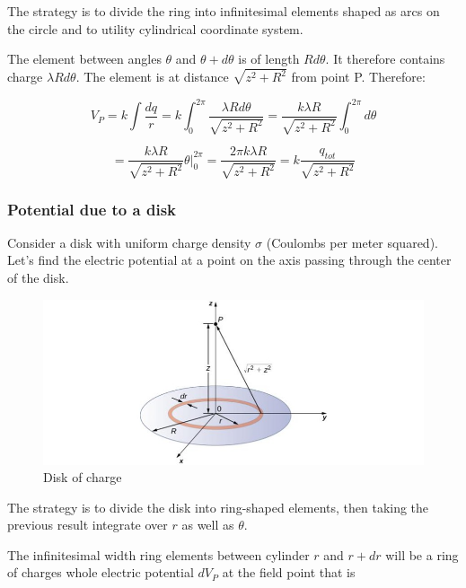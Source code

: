 \documentclass[14pt]{memoir}
\begin{document}
The strategy is to divide the ring into infinitesimal elements shaped as arcs on the circle and to utility cylindrical coordinate system.

The element between angles  $\theta$ and $\theta + d\theta$ is of length $R d\theta$. It therefore contains charge $\lambda R d\theta$. The element is at distance $\sqrt{z^2 + R^2}$ from point P. Therefore:

\begin{equation}
V_P = k \int \frac{dq}{r} = k \int_0^{2\pi} \frac{\lambda R d\theta}{\sqrt{z^2 + R^2}} = \frac{k \lambda R}{\sqrt{z^2 + R^2}} \int_0^{2\pi} d\theta
\end{equation}

\begin{equation}
 = \frac{k \lambda R}{\sqrt{z^2 + R^2}} \theta \bigg\rvert_{0}^{2\pi} = \frac{2 \pi k \lambda R}{\sqrt{z^2 + R^2}} = k \frac{q_{tot}}{\sqrt{z^2 + R^2}}
\end{equation}

\subsubsection{Potential due to a disk}

Consider a disk with uniform charge density $\sigma$ (Coulombs per meter squared). Let's find the electric potential at a point on the axis passing through the center of the disk. 

\begin{figure}[H]
\begin{center}
\includegraphics[scale=0.50]{fig/fig_07_25.jpg}
\caption{Disk of charge}
\label{fig:07_25}
\end{center}
\end{figure}

The strategy is to divide the disk into ring-shaped elements, then taking the previous result integrate over $r$ as well as $\theta$.

The infinitesimal width ring elements between cylinder $r$ and $r + dr$ will be a ring of charges whole electric potential $dV_P$ at the field point that is
\end{document}
